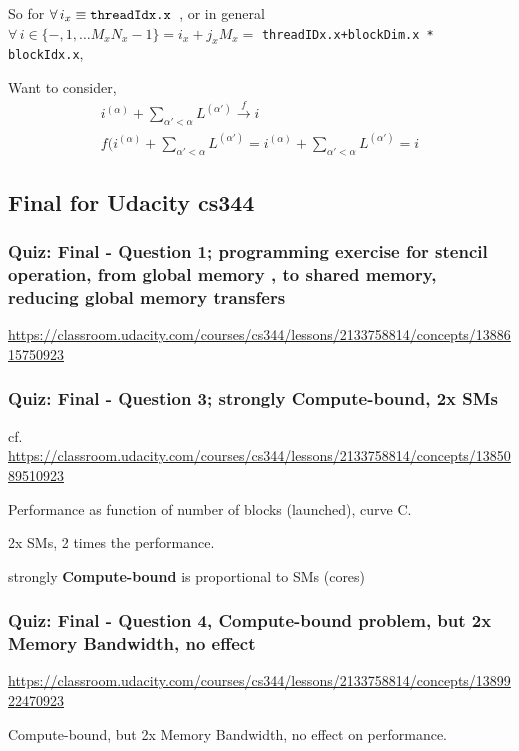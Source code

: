 \documentclass[10pt]{amsart}
\begin{document}
\begin{multicols*}{2}
So for $\forall \, i_x \equiv \verb|threadIdx.x |$, 
or in general
$\forall \, i \in \lbrace - ,1,\dots M_xN_x-1\rbrace = i_x+j_xM_x = $ \verb|threadIDx.x+blockDim.x * blockIdx.x|, 

Want to consider, 
\[
\begin{gathered}
	i^{(\alpha)} + \sum_{\alpha' < \alpha }L^{(\alpha')} \xrightarrow{f} i \\ 
 f(i^{(\alpha)} + \sum_{\alpha' < \alpha} L^{(\alpha') } = i^{(\alpha)} + \sum_{\alpha' < \alpha} L^{(\alpha')} = i 
\end{gathered}
\]

\subsection{Final for Udacity cs344}

\subsubsection{Quiz: Final - Question 1; programming exercise for stencil operation, from global memory , to shared memory, reducing global memory transfers}

\url{https://classroom.udacity.com/courses/cs344/lessons/2133758814/concepts/1388615750923}

\subsubsection{Quiz: Final - Question 3; strongly Compute-bound, 2x SMs}

cf. \url{https://classroom.udacity.com/courses/cs344/lessons/2133758814/concepts/1385089510923}

Performance as function of number of blocks (launched), curve C.  

2x SMs, 2 times the performance.  

strongly \textbf{Compute-bound} is proportional to SMs (cores)

\subsubsection{Quiz: Final - Question 4, Compute-bound problem, but 2x Memory Bandwidth, no effect}

\url{https://classroom.udacity.com/courses/cs344/lessons/2133758814/concepts/1389922470923}

Compute-bound, but 2x Memory Bandwidth, no effect on performance.  


\end{multicols*}
\end{document}

